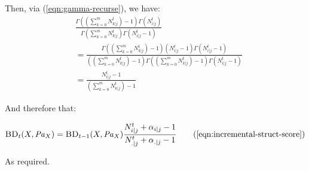 \documentclass{article}
\newcommand{\Pa}{\mathit{Pa}}
\begin{document}
	Then, via (\ref{eqn:gamma-recurse}), we have:
	\begin{align*}
	&\frac
	{\Gamma((\sum_{k=0}^m N^{t}_{k|j}) - 1) \Gamma(N^t_{i|j})}
	{\Gamma(\sum_{k=0}^m N^{t}_{k|j}) \Gamma(N^{t}_{i | j} - 1)} \\
	&= \frac
	{\Gamma((\sum_{k=0}^m N^{t}_{k|j}) - 1) (N^t_{i|j} - 1) \Gamma(N^t_{i|j} - 1)}
	{((\sum_{k=0}^m N^{t}_{k|j}) - 1) \Gamma((\sum_{k=0}^m N^{t}_{k|j}) - 1) \Gamma(N^{t}_{i | j} - 1)} \\
	&= \frac
	{N^t_{i|j} - 1}
	{(\sum_{k=0}^m N^{t}_{k|j}) - 1} 
	\end{align*}
	
	And therefore that:
	
	\begin{equation}
	\textsc{BD}_{t}(X, \Pa_X) = \textsc{BD}_{t-1}(X, \Pa_X) \frac{N^{t}_{i|j} + \alpha_{i | j} - 1}{N^{t}_{.|j} + \alpha_{.|j} - 1}
	\tag{\ref{eqn:incremental-struct-score}}
	\end{equation}
		
	As required.
	
\end{document}
